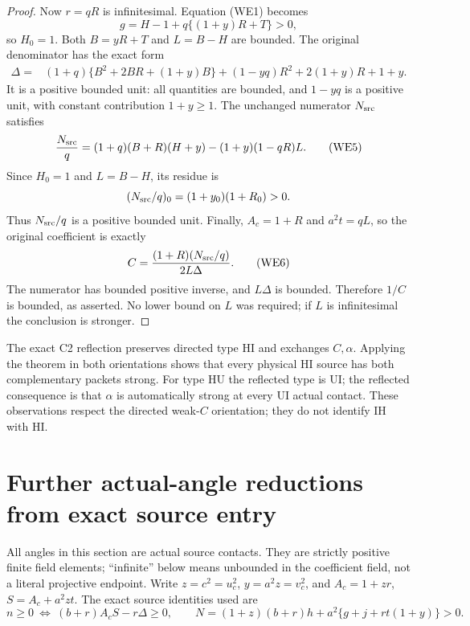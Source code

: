 \begin{proof}
Now $r=qR$ is infinitesimal.  Equation (WE1) becomes
\[
             g=H-1+q\{(1+y)R+T\}>0,
\]
so $H_0=1$.  Both $B=yR+T$ and $L=B-H$ are bounded.
The original denominator has the exact form
\begin{align*}
 \Delta={}&(1+q)\{B^2+2BR+(1+y)B\}
           +(1-yq)R^2+2(1+y)R+1+y.                \tag{WE4}
\end{align*}
It is a positive bounded unit: all quantities are bounded, and
$1-yq$ is a positive unit, with constant contribution $1+y\geq1$.
The unchanged numerator $N_{\rm src}$ satisfies
\[
 \frac{N_{\rm src}}q
  =(1+q)(B+R)(H+y)-(1+y)(1-qR)L.                  \tag{WE5}
\]
Since $H_0=1$ and $L=B-H$, its residue is
\[
       (N_{\rm src}/q)_0=(1+y_0)(1+R_0)>0.
\]
Thus $N_{\rm src}/q$ is a positive bounded unit.  Finally,
$A_c=1+R$ and $a^2t=qL$, so the original coefficient is exactly
\[
          C=\frac{(1+R)(N_{\rm src}/q)}{2L\Delta}.
                                                               \tag{WE6}
\]
The numerator has bounded positive inverse, and $L\Delta$ is
bounded.  Therefore $1/C$ is bounded, as asserted.  No lower bound
on $L$ was required; if $L$ is infinitesimal the conclusion is
stronger.
\end{proof}

The exact C2 reflection preserves directed type HI and exchanges
$C,\alpha$.  Applying the theorem in both orientations shows that
every physical HI source has both complementary packets strong.
For type HU the reflected type is UI; the reflected consequence is
that $\alpha$ is automatically strong at every UI actual contact.
These observations respect the directed weak-$C$ orientation; they
do not identify IH with HI.


\section{\texorpdfstring{Further actual-angle reductions from exact source entry}{Further actual-angle reductions from exact source entry}}
\label{component:pe56fb394b522}

\label{pe56fb394b522:sec:c2-angle-reductions}

All angles in this section are actual source contacts. They are strictly
positive finite field elements; ``infinite'' below means unbounded in
the coefficient field, not a literal projective endpoint. Write
$z=c^2=u_c^2$, $y=a^2z=v_c^2$, and
$A_c=1+zr$, $S=A_c+a^2zt$. The exact source identities used are
\[
 n\ge0\ \Longleftrightarrow\ (b+r)A_cS-r\Delta\ge0,
 \qquad
 N=(1+z)(b+r)h+a^2\{g+j+rt(1+y)\}>0.
\]

